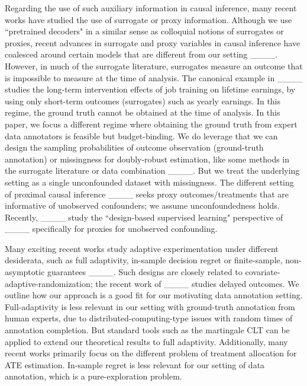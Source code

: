 Regarding the use of such auxiliary information in causal inference, many recent works have studied the use of surrogate or proxy information. Although we use ``pretrained decoders" in a similar sense as colloquial notions of surrogates or proxies, recent advances in surrogate and proxy variables in causal inference have coalesced around certain models that are different from our setting ____. However, in much of the surrogate literature, surrogates measure an outcome that is impossible to measure at the time of analysis. The canonical example in ____ studies the long-term intervention effects of job training on lifetime earnings, by using only short-term outcomes (surrogates) such as yearly earnings. In this regime, the ground truth cannot be obtained at the time of analysis. In this paper, we focus a different regime where obtaining the ground truth from expert data annotators is feasible but budget-binding. 
We do leverage that we can design the sampling probabilities of outcome observation (ground-truth annotation) or missingness for doubly-robust estimation, like some methods in the surrogate literature or data combination ____. But we treat the underlying setting as a single unconfounded dataset with missingness. 
The different setting of proximal causal inference ____ seeks proxy outcomes/treatments that are informative of unobserved confounders; we assume unconfoundedness holds. Recently, ____ study the ``design-based supervised learning" perspective of ____ specifically for proxies for unobserved confounding.



Many exciting recent works study adaptive experimentation under different desiderata, such as full adaptivity, in-sample decision regret or finite-sample, non-asymptotic guarantees ____. Such designs are closely related to covariate-adaptive-randomization; the recent work of  ____ studies delayed outcomes. We outline how our approach is a good fit for our motivating data annotation setting. Full-adaptivity is less relevant in our setting with ground-truth annotation from human experts, due to distributed-computing-type issues with random times of annotation completion. But standard tools such as the martingale CLT can be applied to extend our theoretical results to full adaptivity. Additionally, many recent works primarily focus on the different problem of treatment allocation for ATE estimation. In-sample regret is less relevant for our setting of data annotation, which is a pure-exploration problem.